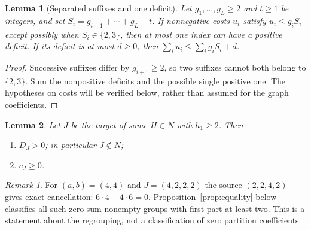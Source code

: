 \documentclass[11pt]{article}
\newtheorem{lemma}{Lemma}
\theoremstyle{remark}
\newtheorem{remark}{Remark}
\theoremstyle{definition}
\begin{document}
\begin{lemma}[Separated suffixes and one deficit]\label{lem:one-deficit}
Let $g_1,\ldots,g_L\ge2$ and $t\ge1$ be integers, and set $S_i=g_{i+1}+\cdots+g_L+t$. If nonnegative costs $u_i$ satisfy $u_i\le g_iS_i$ except possibly when $S_i\in\{2,3\}$, then at most one index can have a positive deficit. If its deficit is at most $d\ge0$, then $\sum_i u_i\le\sum_i g_iS_i+d$.
\end{lemma}
\begin{proof}
Successive suffixes differ by $g_{i+1}\ge2$, so two suffixes cannot both belong to $\{2,3\}$. Sum the nonpositive deficits and the possible single positive one. The hypotheses on costs will be verified below, rather than assumed for the graph coefficients.
\end{proof}

\begin{lemma}\label{lem:main}
Let $J$ be the target of some $H\in N$ with $h_1\ge2$. Then
\begin{enumerate}
\item[(i)] $D_J>0$; in particular $J\notin N$;
\item[(ii)] $c_J\ge0$.
\end{enumerate}
\end{lemma}

\begin{remark}
For $(a,b)=(4,4)$ and $J=(4,2,2,2)$ the source $(2,2,4,2)$ gives exact cancellation: $6\cdot4-4\cdot6=0$. Proposition~\ref{prop:equality} below classifies all such zero-sum nonempty groups with first part at least two. This is a statement about the regrouping, not a classification of zero partition coefficients.
\end{remark}
\end{document}
